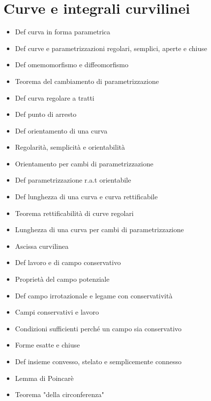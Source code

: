 \documentclass[10pt,a4paper, twocolumn]{article}
\renewcommand{\,}{\text{, }}
\begin{document}
\section{Curve e integrali curvilinei}
\begin{itemize}
    \item Def curva in forma parametrica
    \item Def curve e parametrizzazioni regolari, semplici, aperte e chiuse
    \item Def omemomorfismo e diffeomorfismo
    \item Teorema del cambiamento di parametrizzazione
    \item Def curva regolare a tratti
    \item Def punto di arresto
    \item Def orientamento di una curva
    \item Regolarità, semplicità e orientabilità
    \item Orientamento per cambi di parametrizzazione
    \item Def parametrizzazione r.a.t orientabile
    \item Def lunghezza di una curva e curva rettificabile
    \item Teorema rettificabilità di curve regolari
    \item Lunghezza di una curva per cambi di parametrizzazione
    \item Ascissa curvilinea
    \item Def lavoro e di campo conservativo
    \item Proprietà del campo potenziale
    \item Def campo irrotazionale e legame con conservatività
    \item Campi conservativi e lavoro
    \item Condizioni sufficienti perché un campo sia conservativo
    \item Forme esatte e chiuse
    \item Def insieme convesso, stelato e semplicemente connesso
    \item Lemma di Poincarè
    \item Teorema "della circonferenza"
\end{itemize}
\end{document}
